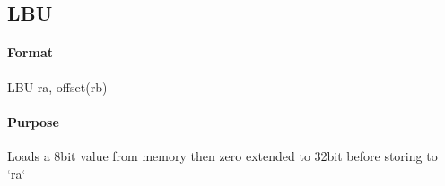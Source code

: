 \subsection{LBU}


\paragraph{Format} LBU ra, offset(rb)

\paragraph{Purpose} Loads a 8bit value from memory then zero extended to 32bit before storing to `ra`